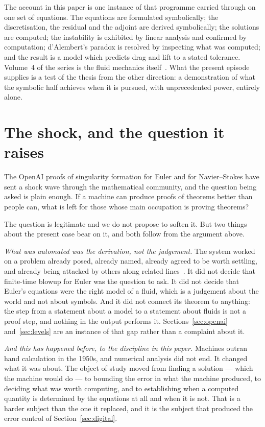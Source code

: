 \documentclass[11pt]{article}
\begin{document}
The account in this paper is one instance of that programme carried through on one set of equations.
The equations are formulated symbolically; the discretisation, the residual and the adjoint are
derived symbolically; the solutions are computed; the instability is exhibited by linear analysis and
confirmed by computation; d'Alembert's paradox is resolved by inspecting what was computed; and the
result is a model which predicts drag and lift to a stated tolerance. Volume~4 of the series is the
fluid mechanics itself~\cite{book}. What the present episode supplies is a test of the thesis from
the other direction: a demonstration of what the symbolic half achieves when it is pursued, with
unprecedented power, entirely alone.

\section{The shock, and the question it raises}\label{sec:shock}

The OpenAI proofs of singularity formation for Euler and for Navier--Stokes have sent a shock wave
through the mathematical community, and the question being asked is plain enough. If a machine can
produce proofs of theorems better than people can, what is left for those whose main occupation is
proving theorems?

The question is legitimate and we do not propose to soften it. But two things about the present case
bear on it, and both follow from the argument above.

\emph{What was automated was the derivation, not the judgement.} The system worked on a problem
already posed, already named, already agreed to be worth settling, and already being attacked by
others along related lines~\cite{buckmaster}. It did not decide that finite-time blowup for Euler
was the question to ask. It did not decide that Euler's equations were the right model of a fluid,
which is a judgement about the world and not about symbols. And it did not connect its theorem to
anything: the step from a statement about a model to a statement about fluids is not a proof step,
and nothing in the output performs it. Sections~\ref{sec:openai} and~\ref{sec:levels} are an
instance of that gap rather than a complaint about it.

\emph{And this has happened before, to the discipline in this paper.} Machines outran hand
calculation in the 1950s, and numerical analysis did not end. It changed what it was about. The
object of study moved from finding a solution --- which the machine would do --- to bounding the
error in what the machine produced, to deciding what was worth computing, and to establishing when a
computed quantity is determined by the equations at all and when it is not. That is a harder subject
than the one it replaced, and it is the subject that produced the error control of
Section~\ref{sec:digital}.
\end{document}
